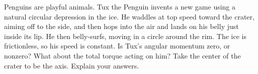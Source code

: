 Penguins are playful animals. Tux the Penguin invents a new game using a natural
circular depression in the ice. He waddles at top speed toward the crater,
aiming off to the side, and then hops into the air and lands on his belly just
inside its lip. He then belly-surfs, moving in a circle around the rim. The ice
is frictionless, so his speed is constant.
Is Tux's angular momentum zero, or nonzero? What about the total torque acting
on him? Take the center of the crater to be the axis. Explain your answers.
